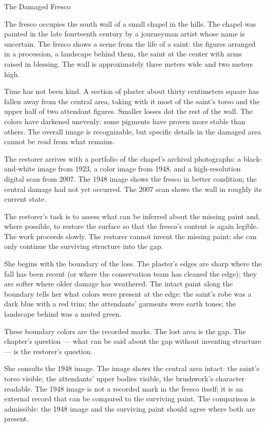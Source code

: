 \begin{coda}{The Damaged Fresco}

The fresco occupies the south wall of a small chapel in the hills.
The chapel was painted in the late fourteenth century by a journeyman
artist whose name is uncertain. The fresco shows a scene from the
life of a saint: the figures arranged in a procession, a landscape
behind them, the saint at the center with arms raised in blessing.
The wall is approximately three meters wide and two meters high.

Time has not been kind. A section of plaster about thirty centimeters
square has fallen away from the central area, taking with it most of
the saint's torso and the upper half of two attendant figures.
Smaller losses dot the rest of the wall. The colors have darkened
unevenly: some pigments have proven more stable than others. The
overall image is recognizable, but specific details in the damaged
area cannot be read from what remains.

The restorer arrives with a portfolio of the chapel's archival
photographs: a black-and-white image from 1923, a color image from
1948, and a high-resolution digital scan from 2007. The 1948 image
shows the fresco in better condition; the central damage had not yet
occurred. The 2007 scan shows the wall in roughly its current state.

The restorer's task is to assess what can be inferred about the
missing paint and, where possible, to restore the surface so that
the fresco's content is again legible. The work proceeds slowly. The
restorer cannot invent the missing paint; she can only continue the
surviving structure into the gap.

She begins with the boundary of the loss. The plaster's edges are
sharp where the fall has been recent (or where the conservation team
has cleaned the edge); they are softer where older damage has
weathered. The intact paint along the boundary tells her what
colors were present at the edge: the saint's robe was a dark blue
with a red trim; the attendants' garments were earth tones; the
landscape behind was a muted green.

These boundary colors are the recorded marks. The lost area is the
gap. The chapter's question --- what can be said about the gap
without inventing structure --- is the restorer's question.

She consults the 1948 image. The image shows the central area
intact: the saint's torso visible, the attendants' upper bodies
visible, the brushwork's character readable. The 1948 image is
not a recorded mark in the fresco itself; it is an external
record that can be compared to the surviving paint. The
comparison is admissible: the 1948 image and the surviving paint
should agree where both are present.


\end{coda}
